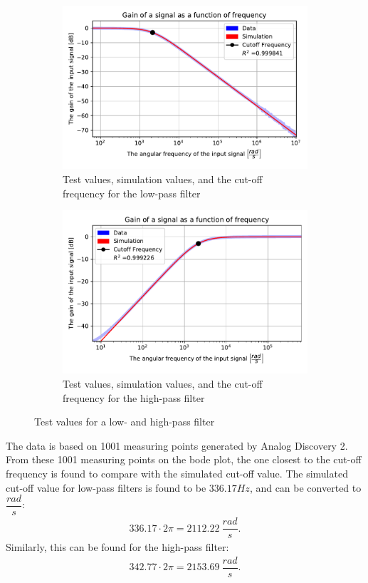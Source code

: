 \begin{figure}[H]
\centering
	\begin{subfigure}[b]{0.49\textwidth}
		\includegraphics[width=\textwidth]{fig/img/LPF_exp.pdf}
    		\caption{Test values, simulation values, and the cut-off frequency for the low-pass filter}
    		\label{fig:lpf:exp}
	\end{subfigure}
	\begin{subfigure}[b]{0.49\textwidth}
		\includegraphics[width=\textwidth]{fig/img/HPF_exp.pdf}
    		\caption{Test values, simulation values, and the cut-off frequency for the high-pass filter}
    		\label{fig:hpf:exp}
	\end{subfigure}
	\caption{Test values for a low- and high-pass filter}
\end{figure}
The data is based on 1001 measuring points generated by Analog Discovery 2. From these 1001 measuring points on the bode plot, the one closest to the cut-off frequency is found to compare with the simulated cut-off value. The simulated cut-off value for low-pass filters is found to be $336.17 Hz$, and can be converted to $\dfrac{rad}{s}$:
\begin{align}
336.17 \cdot 2 \pi = 2112.22 \ \dfrac{rad}{s}.
 \label{lpf:cut}
\end{align}
Similarly, this can be found for the high-pass filter:
\begin{align}
342.77 \cdot 2 \pi = 2153.69 \ \dfrac{rad}{s}.
 \label{hpf:cut}
\end{align}
